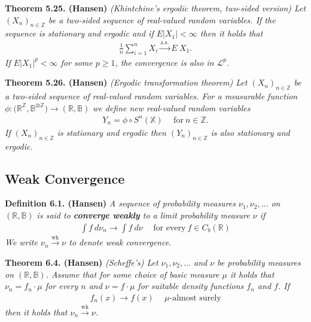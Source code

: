 \documentclass[
]{book}
\begin{document}
\textbf{Theorem 5.25. (Hansen)} \emph{(Khintchine's ergodic theorem, two-sided version) Let \((X_n)_{n\in\mathbb{Z}}\) be a two-sided sequence of real-valued random variables. If the sequence is stationary and ergodic and if \(E\vert X_1\vert <\infty\) then it holds that}
\begin{align*}
    \frac{1}{n}\sum_{i=1}^nX_i\stackrel{\text{a.s.}}{\to} E\ X_1.\tag{5.30}
\end{align*}
\emph{If \(E\vert X_1\vert^p<\infty\) for some \(p\ge 1\), the convergence is also in \(\mathcal{L}^p\).}

\textbf{Theorem 5.26. (Hansen)} \emph{(Ergodic transformation theorem) Let \((X_n)_{n\in\mathbb{Z}}\) be a two-sided sequence of real-valued random variables. For a measurable function} \(\phi : \big(\mathbb{R}^{\mathbb{Z}},\mathbb{B}^{\otimes\mathbb{Z}}\big)\to (\mathbb{R},\mathbb{B})\) \emph{we define new real-valued random variables}
\begin{align*}
    Y_n=\phi\circ S^{n}(\mathbb{X})\hspace{15pt}\text{for}\ n\in\mathbb{Z}.
\end{align*}
\emph{If \((X_n)_{n\in\mathbb{Z}}\) is stationary and ergodic then \((Y_n)_{n\in\mathbb{Z}}\) is also stationary and ergodic.}

\hypertarget{weak-convergence}{%
\subsection{Weak Convergence}\label{weak-convergence}}

\textbf{Definition 6.1. (Hansen)} \emph{A sequence of probability measures \(\nu_1,\nu_2,...\) on \((\mathbb{R},\mathbb{B})\) is said to \textbf{converge weakly} to a limit probability measure \(\nu\) if}
\begin{align*}
    \int f\ d\nu_n\to \int f\ d\nu\hspace{15pt}\text{for every}\ f\in C_b(\mathbb{R})\tag{6.2}
\end{align*}
\emph{We write \(\nu_n\stackrel{\text{wk}}{\to} \nu\) to denote weak convergence.}

\textbf{Theorem 6.4. (Hansen)} \emph{(Scheffe's) Let \(\nu_1,\nu_2,...\) and \(\nu\) be probability measures on \((\mathbb{R},\mathbb{B})\). Assume that for some choice of basic measure \(\mu\) it holds that \(\nu_n=f_n\cdot \mu\) for every \(n\) and \(\nu = f\cdot \mu\) for suitable density functions \(f_n\) and \(f\). If}
\begin{align*}
    f_n(x)\to f(x)\hspace{15pt}\mu\text{-almost surely}
\end{align*}
\emph{then it holds that \(\nu_n\stackrel{\text{wk}}{\to} \nu\).}
\end{document}
